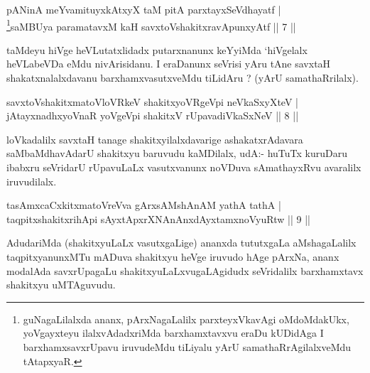 
\begin{shl}
pANinA meYvamituyxkAtxyX taM pitA parxtayxSeVdhayatf | \\
\footnote{guNagaLilalxda ananx, pArxNagaLalilx parxteyxVkavAgi oMdoMdakUkx, yoVgayxteyu ilalxvAdadxriMda barxhamxtavxvu eraDu kUDidAga I barxhamxsavxrUpavu iruvudeMdu tiLiyalu yArU samathaRrAgilalxveMdu tAtapxyaR.}saMBUya paramatavxM kaH savxtoVshakitxravApunxyAtf \hfill ||  7 || 
\end{shl}

\begin{artha}
taMdeyu hiVge heVLutatxlidadx putarxnanunx keYyiMda `hiVgelalx heVLabeVDa eMdu nivArisidanu. I eraDanunx seVrisi yAru tAne savxtaH shakatxnalalxdavanu barxhamxvasutxveMdu tiLidAru ? (yArU samathaRrilalx).
\end{artha}


\begin{shl}
savxtoV\s shakitxmatoVloVRkeV shakitxyoVRgeV\s pi neVkaSxyXteV | \\
jAtayxnadhxyoVnaR yoVgeV\s pi shakitxV rUpavadiVkaSxNeV \hfill ||  8 || 
\end{shl}

\begin{artha}
loVkadalilx savxtaH tanage shakitxyilalxdavarige ashakatxrAdavara saMbaMdhavAdarU shakitxyu baruvudu kaMDilalx, udA:- huTuTx kuruDaru ibabxru seVridarU rUpavuLaLx vasutxvanunx noVDuva sAmathayxRvu avaralilx iruvudilalx.
\end{artha}

\begin{shl}
tasAmxcaCxkitxmatoVreVva gArxsAMshAnAM yathA tathA | \\
taqpitxshakitxrihApi sAyxtApxrXNAnAnxdAyxtamxnoVyuRtw \hfill ||  9 || 
\end{shl}

\begin{artha}
AdudariMda (shakitxyuLaLx vasutxgaLige) ananxda tututxgaLa aMshagaLalilx taqpitxyanunxMTu mADuva shakitxyu heVge iruvudo hAge pArxNa, ananx modalAda savxrUpagaLu shakitxyuLaLxvugaLAgidudx seVridalilx barxhamxtavx shakitxyu uMTAguvudu.
\end{artha}


